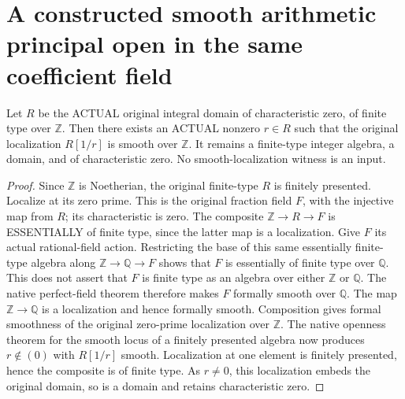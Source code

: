 \section{A constructed smooth arithmetic principal open in the same coefficient field}

\begin{theorem}
\label{thm:arithmetic-nonempty-smooth-principal-open}
\leanok
Let $R$ be the ACTUAL original integral domain of characteristic zero, of
finite type over $\mathbb Z$. Then there exists an ACTUAL nonzero $r\in R$
such that the original localization $R[1/r]$ is smooth over $\mathbb Z$.
It remains a finite-type integer algebra, a domain, and of characteristic zero.
No smooth-localization witness is an input.
\end{theorem}
\begin{proof}
Since $\mathbb Z$ is Noetherian, the original finite-type $R$ is finitely
presented. Localize at its zero prime. This is the original fraction field
$F$, with the injective map from $R$; its characteristic is zero. The composite
$\mathbb Z\to R\to F$ is ESSENTIALLY of finite type, since the latter map is
a localization. Give $F$ its actual rational-field action. Restricting the
base of this same essentially finite-type algebra along
$\mathbb Z\to\mathbb Q\to F$ shows that $F$ is essentially of finite type
over $\mathbb Q$. This does not assert that $F$ is finite type as an algebra
over either $\mathbb Z$ or $\mathbb Q$.
The native perfect-field theorem therefore makes $F$ formally smooth over
$\mathbb Q$. The map $\mathbb Z\to\mathbb Q$ is a localization and hence
formally smooth. Composition gives formal smoothness of the original
zero-prime localization over $\mathbb Z$. The native openness theorem for
the smooth locus of a finitely presented algebra now produces $r\notin(0)$
with $R[1/r]$ smooth. Localization at one element is finitely presented,
hence the composite is of finite type. As $r\ne0$, this localization embeds
the original domain, so is a domain and retains characteristic zero.
\end{proof}

